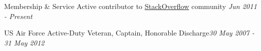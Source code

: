 
\begin{rSection}{Membership \& Service}
  Active contributor to 
  \href{http://stackoverflow.com/users/822162/clayton-stanley}{StackOverflow}
  community \hfill {\em Jun 2011 - Present}
\item US Air Force Active-Duty Veteran, Captain, Honorable Discharge\hfill {\em 30 May 2007 - 31 May 2012}
\end{rSection}

